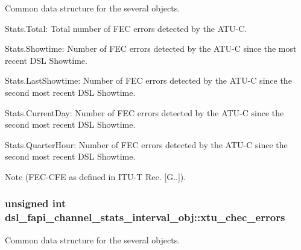 Common data structure for the several objects.
\begin{DoxyItemize}
\item Stats.\-Total\-: Total number of F\-E\-C errors detected by the A\-T\-U-\/\-C.
\item Stats.\-Showtime\-: Number of F\-E\-C errors detected by the A\-T\-U-\/\-C since the most recent D\-S\-L Showtime.
\item Stats.\-Last\-Showtime\-: Number of F\-E\-C errors detected by the A\-T\-U-\/\-C since the second most recent D\-S\-L Showtime.
\item Stats.\-Current\-Day\-: Number of F\-E\-C errors detected by the A\-T\-U-\/\-C since the second most recent D\-S\-L Showtime.
\item Stats.\-Quarter\-Hour\-: Number of F\-E\-C errors detected by the A\-T\-U-\/\-C since the second most recent D\-S\-L Showtime. \begin{DoxyNote}{Note}
(F\-E\-C-\/\-C\-F\-E as defined in I\-T\-U-\/\-T Rec. \mbox{[}G..\mbox{]}). 
\end{DoxyNote}

\end{DoxyItemize}\hypertarget{structdsl__fapi__channel__stats__interval__obj_ac0de9e7853f8afe8b8d55a683ab68da2}{
\subsubsection[{xtu\-\_\-chec\-\_\-errors}]{\setlength{\rightskip}{0pt plus 5cm}unsigned int dsl\-\_\-fapi\-\_\-channel\-\_\-stats\-\_\-interval\-\_\-obj\-::xtu\-\_\-chec\-\_\-errors}}\label{structdsl__fapi__channel__stats__interval__obj_ac0de9e7853f8afe8b8d55a683ab68da2}
Common data structure for the several objects.
